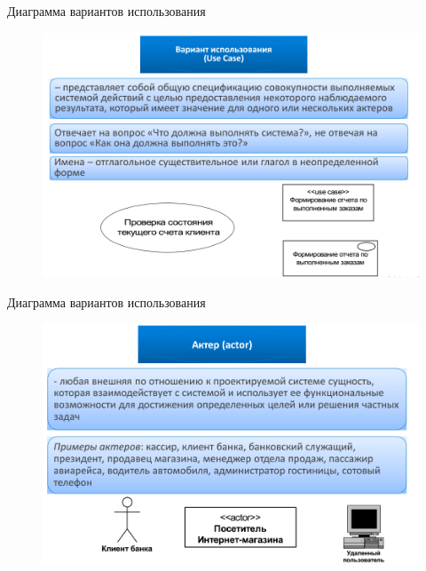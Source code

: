\documentclass{beamer}
\begin{document}
\begin{frame}[t]{Диаграмма вариантов использования}
\begin{figure}[h]
\centering
\includegraphics[scale=0.45]{images/lec03-pic10.png}
\end{figure}
\end{frame}

\begin{frame}[t]{Диаграмма вариантов использования}
\begin{figure}[h]
\centering
\includegraphics[scale=0.45]{images/lec03-pic11.png}
\end{figure}
\end{frame}
\end{document}
